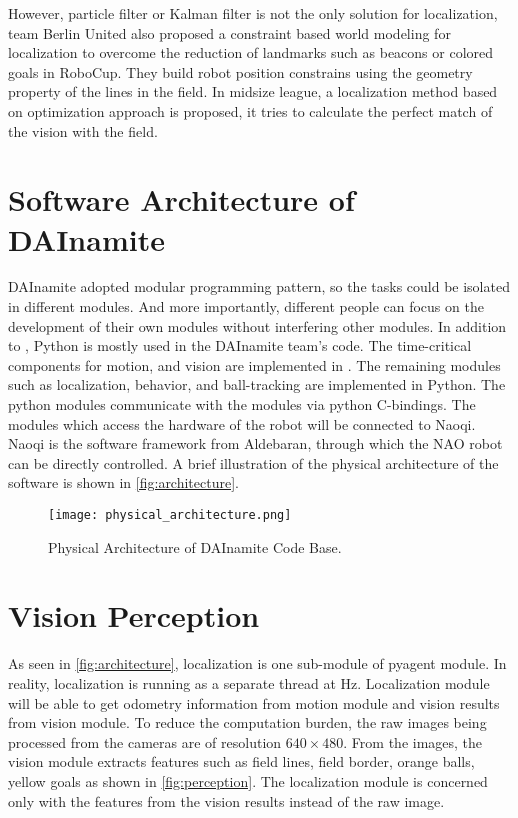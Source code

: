 However, particle filter or Kalman filter is not the only solution for localization, team Berlin United also proposed a constraint based world modeling for localization \cite{Gohring2009} to overcome the reduction of landmarks such as beacons or colored goals in RoboCup. They build robot position constrains using the geometry property of the lines in the field. In midsize league, a localization method based on optimization approach \cite{Lauer2006} is proposed, it tries to calculate the perfect match of the vision with the field.



\section{Software Architecture of DAInamite}\label{sec:arch}
DAInamite adopted modular programming pattern, so the tasks could be isolated in different modules. And more importantly, different people can focus on the development of their own modules without interfering other modules. In addition to \cpp{}, Python is mostly used in the DAInamite team's code.
The time-critical components for motion, and vision are implemented in \cpp{}. The remaining modules such as localization, behavior, and ball-tracking are implemented in Python. The python modules communicate with the \cpp{} modules via python C-bindings. The modules which access the hardware of the robot will be connected to Naoqi. Naoqi is the software framework from Aldebaran, through which the NAO robot can be directly controlled. A brief illustration of the physical architecture of the software is shown in \autoref{fig:architecture}. 

\begin{figure}[h!]
  \centering
  \texttt{[image: physical\_architecture.png]}
  \caption{Physical Architecture of DAInamite Code Base.}
  \label{fig:architecture}
\end{figure}

\section{Vision Perception}\label{sec:vision}
As seen in \autoref{fig:architecture}, localization is one sub-module of pyagent module. In reality, localization is running as a separate thread at \unit[30]{Hz}. Localization module will be able to get odometry information from motion module and vision results from vision module. To reduce the computation burden, the raw images being processed from the cameras are of resolution $640 \times 480$. From the images, the vision module extracts features such as field lines, field border, orange balls, yellow goals as shown in \autoref{fig:perception}. The localization module is concerned only with the features from the vision results instead of the raw image.


